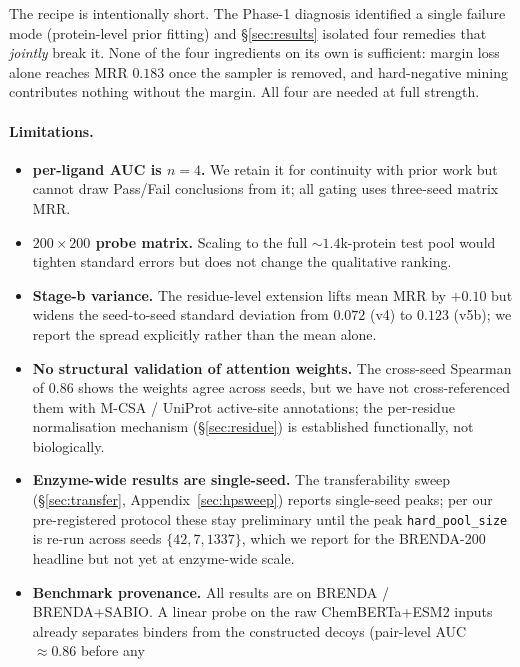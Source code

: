 \documentclass[11pt,a4paper]{article}
\newcommand{\plauc}{per-ligand AUC}
\newcommand{\matmrr}{matrix MRR}
\begin{document}
The recipe is intentionally short. The Phase-1 diagnosis identified a
single failure mode (protein-level prior fitting) and
\S\ref{sec:results} isolated four remedies that \emph{jointly} break
it. None of the four ingredients on its own is sufficient: margin loss
alone reaches MRR $0.183$ once the sampler is removed, and
hard-negative mining contributes nothing without the margin. All four
are needed at full strength.

\paragraph{Limitations.}
\begin{itemize}[leftmargin=*,itemsep=0pt,topsep=1pt]
  \item \textbf{\plauc{} is $n=4$.} We retain it for continuity with
        prior work but cannot draw Pass/Fail conclusions from it; all
        gating uses three-seed \matmrr.
  \item \textbf{$200 \times 200$ probe matrix.} Scaling to the full
        $\sim 1.4$k-protein test pool would tighten standard errors but
        does not change the qualitative ranking.
  \item \textbf{Stage-b variance.} The residue-level extension lifts
        mean MRR by $+0.10$ but widens the seed-to-seed standard
        deviation from $0.072$ (v4) to $0.123$ (v5b); we report the
        spread explicitly rather than the mean alone.
  \item \textbf{No structural validation of attention weights.} The
        cross-seed Spearman of $0.86$ shows the weights agree across
        seeds, but we have not cross-referenced them with M-CSA /
        UniProt active-site annotations; the per-residue normalisation
        mechanism (\S\ref{sec:residue}) is established functionally,
        not biologically.
  \item \textbf{Enzyme-wide results are single-seed.} The
        transferability sweep (\S\ref{sec:transfer},
        Appendix~\ref{sec:hpsweep}) reports single-seed peaks; per our
        pre-registered protocol these stay preliminary until the peak
        \texttt{hard\_pool\_size} is re-run across seeds
        $\{42, 7, 1337\}$, which we report for the BRENDA-200 headline
        but not yet at enzyme-wide scale.
  \item \textbf{Benchmark provenance.} All results are on
        BRENDA / BRENDA+SABIO. A linear probe on the raw
        ChemBERTa+ESM2 inputs already separates binders from the
        constructed decoys (pair-level AUC $\approx 0.86$ before any

\end{itemize}
\end{document}
